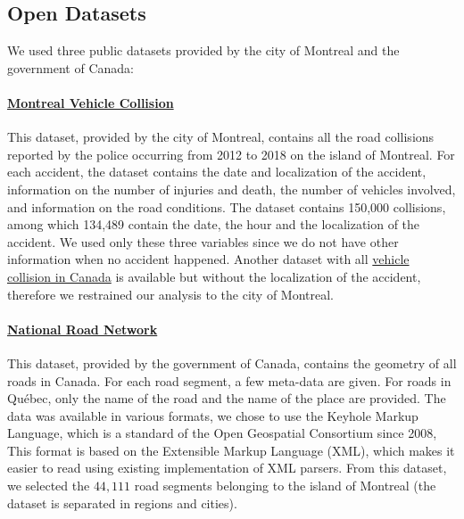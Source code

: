 \documentclass[conference]{IEEEtran}
\begin{document}

\subsection{Open Datasets}
\label{sec:datasets}

We used three public datasets provided by the city of Montreal and the government of Canada: 

\paragraph{\href{http://donnees.ville.montreal.qc.ca/dataset/collisions-routieres}{Montreal Vehicle Collision}}

This dataset, provided by the city of Montreal, contains all the road
collisions reported by the police occurring from 2012 to 2018 on the island
of Montreal. For each accident, the dataset contains the date and
localization of the accident, information on the number of injuries and
death, the number of vehicles involved, and information on the road
conditions. The dataset contains 150,000 collisions, among which 134,489
contain the date, the hour and the localization of the accident. We used
only these three variables since we do not have other information when no accident happened.
Another dataset with all \href{https://open.canada.ca/data/en/dataset/1eb9eba7-71d1-4b30-9fb1-30cbdab7e63a}{vehicle collision in Canada} is available but
without the localization of the accident, therefore we restrained our
analysis to the city of Montreal.

\paragraph{\href{https://open.canada.ca/data/en/dataset/3d282116-e556-400c-9306-ca1a3cada77f}{National Road Network}}

This dataset, provided by the government of Canada, contains the geometry of
all roads in Canada. For each road segment, a few meta-data are given. For
roads in Québec, only the name of the road and the name of the place are provided. The
data was available in various formats, we chose to use the Keyhole Markup
Language, which is a standard of the Open Geospatial Consortium since 2008\cite{kml}, 
This format is based on the Extensible Markup Language (XML), which makes it
easier to read using existing implementation of XML parsers. From this
dataset, we selected the $44,111$ road segments belonging to the island of
Montreal (the dataset is separated in regions and cities).
\end{document}
